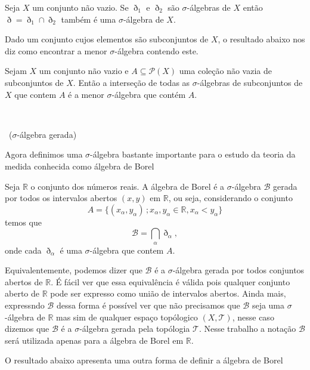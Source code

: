 \documentclass[a4paper, 11pt]{book}
\theoremstyle{definition}
\newcommand{\obs}{\noindent{\textbf{\textcolor{black}{\sffamily Observação:}}}~}
\newcommand{\bR}{\mathbb{R}}
\newcommand{\cB}{\mathcal{B}}
\newcommand{\cT}{\mathcal{T}}
\begin{document}
\begin{ex}
    Seja $X$ um conjunto não vazio. Se $\eth_1$ e $\eth_2$ são $\sigma$-álgebras de $X$ então $\eth = \eth_1 \cap \eth_2$ também é uma $\sigma$-álgebra de $X$.
\end{ex}

Dado um conjunto cujos elementos são subconjuntos de $X$, o resultado abaixo nos diz como encontrar a menor $\sigma$-álgebra contendo este.

\begin{pbox}
    Sejam $X$ um conjunto não vazio e $A \subseteq \mathcal{P}(X)$ uma coleção não vazia de subconjuntos de $X$. Então a interseção de todas as $\sigma$-álgebras de subconjuntos de $X$ que contem $A$ é a menor $\sigma$-álgebra que contém $A$.
\end{pbox}
\begin{prf}
    ~
\end{prf}

\obs ($\sigma$-álgebra gerada)

Agora definimos uma $\sigma$-álgebra bastante importante para o estudo da teoria da medida conhecida como álgebra de Borel

\begin{dbox}
    Seja $\bR$ o conjunto dos números reais. A álgebra de Borel é a $\sigma$-álgebra $\cB$ gerada por todos os intervalos abertos $(x,y)$ em $\bR$, ou seja, considerando o conjunto
    \[
        A = \{(x_\alpha, y_\alpha) \,; x_\alpha, y_\alpha \in \bR, x_\alpha < y_\alpha\}  
    \]
    temos que
    \[
        \cB = \bigcap_\alpha \eth_\alpha,
    \]
    onde cada $\eth_\alpha$ é uma $\sigma$-álgebra que contem $A$.
\end{dbox}

Equivalentemente, podemos dizer que $\cB$ é a $\sigma$-álgebra gerada por todos conjuntos abertos de $\bR$.
É fácil ver que essa equivalência é válida pois qualquer conjunto aberto de $\bR$ pode ser expresso como união de intervalos abertos. 
Ainda mais, expressndo $\cB$ dessa forma é possível ver que não precisamos que $\cB$ seja uma $\sigma$-álgebra de $\bR$ mas sim de qualquer espaço topólogico $(X,\cT)$, nesse caso dizemos que $\cB$ é a $\sigma$-álgebra gerada pela topólogia $\cT$.
Nesse trabalho a notação $\cB$ será utilizada apenas para a álgebra de Borel em $\bR$.

O resultado abaixo apresenta uma outra forma de definir a álgebra de Borel
\end{document}
